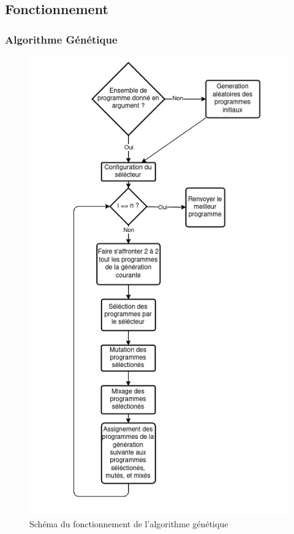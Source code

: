 \documentclass{beamer}
\begin{document}
\subsection{Fonctionnement}
\begin{frame}
\frametitle{Algorithme Génétique}
\begin{figure}
	\includegraphics[height=0.8\textheight]{images/schema-algogen.png}
	\caption{Schéma du fonctionnement de l'algorithme génétique}
\end{figure}
\end{frame}
\end{document}
